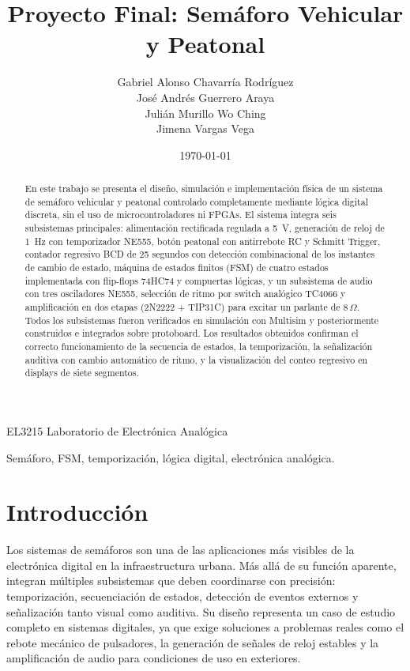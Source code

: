 \documentclass[12pt,onecolumn]{IEEEtran}
\title{Proyecto Final: Semáforo Vehicular y Peatonal}
\author{
Gabriel Alonso Chavarría Rodríguez\\
José Andrés Guerrero Araya\\
Julián Murillo Wo Ching\\
Jimena Vargas Vega
}
\date{\today}
\begin{document}
%
{EL3215 Laboratorio de Electrónica Analógica}

\maketitle

\begin{abstract}
En este trabajo se presenta el diseño, simulación e implementación física de un sistema de semáforo vehicular y peatonal controlado completamente mediante lógica digital discreta, sin el uso de microcontroladores ni FPGAs. El sistema integra seis subsistemas principales: alimentación rectificada regulada a 5~V, generación de reloj de 1~Hz con temporizador NE555, botón peatonal con antirrebote RC y Schmitt Trigger, contador regresivo BCD de 25 segundos con detección combinacional de los instantes de cambio de estado, máquina de estados finitos (FSM) de cuatro estados implementada con flip-flops 74HC74 y compuertas lógicas, y un subsistema de audio con tres osciladores NE555, selección de ritmo por switch analógico TC4066 y amplificación en dos etapas (2N2222 + TIP31C) para excitar un parlante de $8\,\Omega$. Todos los subsistemas fueron verificados en simulación con Multisim y posteriormente construidos e integrados sobre protoboard. Los resultados obtenidos confirman el correcto funcionamiento de la secuencia de estados, la temporización, la señalización auditiva con cambio automático de ritmo, y la visualización del conteo regresivo en displays de siete segmentos.
\end{abstract}

\begin{IEEEkeywords}
Semáforo, FSM, temporización, lógica digital, electrónica analógica.
\end{IEEEkeywords}

\section{Introducción}

Los sistemas de semáforos son una de las aplicaciones más visibles de la electrónica digital en la infraestructura urbana. Más allá de su función aparente, integran múltiples subsistemas que deben coordinarse con precisión: temporización, secuenciación de estados, detección de eventos externos y señalización tanto visual como auditiva. Su diseño representa un caso de estudio completo en sistemas digitales, ya que exige soluciones a problemas reales como el rebote mecánico de pulsadores, la generación de señales de reloj estables y la amplificación de audio para condiciones de uso en exteriores.
\end{document}
